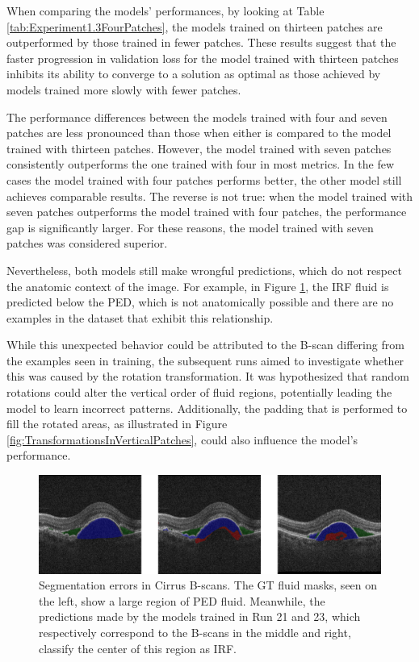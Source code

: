 When comparing the models' performances, by looking at Table \ref{tab:Experiment1.3FourPatches}, the models trained on thirteen patches are outperformed by those trained in fewer patches. These results suggest that the faster progression in validation loss for the model trained with thirteen patches inhibits its ability to converge to a solution as optimal as those achieved by models trained more slowly with fewer patches.
\par
The performance differences between the models trained with four and seven patches are less pronounced than those when either is compared to the model trained with thirteen patches. However, the model trained with seven patches consistently outperforms the one trained with four in most metrics. In the few cases the model trained with four patches performs better, the other model still achieves comparable results. The reverse is not true: when the model trained with seven patches outperforms the model trained with four patches, the performance gap is significantly larger. For these reasons, the model trained with seven patches was considered superior.
\par
Nevertheless, both models still make wrongful predictions, which do not respect the anatomic context of the image. For example, in Figure \ref{fig:CirrusSegmentationErrors}, the IRF fluid is predicted below the PED, which is not anatomically possible and there are no examples in the dataset that exhibit this relationship.
\par
While this unexpected behavior could be attributed to the B-scan differing from the examples seen in training, the subsequent runs aimed to investigate whether this was caused by the rotation transformation. It was hypothesized that random rotations could alter the vertical order of fluid regions, potentially leading the model to learn incorrect patterns. Additionally, the padding that is performed to fill the rotated areas, as illustrated in Figure \ref{fig:TransformationsInVerticalPatches}, could also influence the model's performance.

\begin{figure}[!ht]
	\centering
	\includegraphics[width=1.0\linewidth]{figures/CirrusSegmentationErrors.png}
	\caption{Segmentation errors in Cirrus B-scans. The GT fluid masks, seen on the left, show a large region of PED fluid. Meanwhile, the predictions made by the models trained in Run 21 and 23, which respectively correspond to the B-scans in the middle and right, classify the center of this region as IRF.}
	\label{fig:CirrusSegmentationErrors}
\end{figure}

